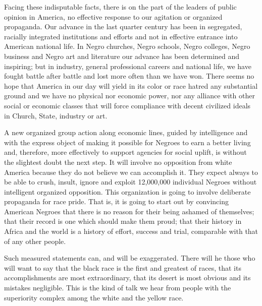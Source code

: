 \documentclass[letterpaper,10pt,english]{jupyterBook}
\begin{document}
\sphinxAtStartPar
Facing these indisputable facts, there is on the part of the leaders of public opinion in America, no effective response to our agitation or organized propaganda. Our advance in the last quarter century has been in segregated, racially integrated institutions and efforts and not in effective entrance into American national life. In Negro churches, Negro schools, Negro colleges, Negro business and Negro art and literature our advance has been determined and inspiring; but in industry, general professional careers and national life, we have fought battle after battle and lost more often than we have won. There seems no hope that America in our day will yield in its color or race hatred any substantial ground and we have no physical nor economic power, nor any alliance with other social or economic classes that will force compliance with decent civilized ideals in Church, State, industry or art.

\sphinxAtStartPar
{}

\sphinxAtStartPar
A new organized group action along economic lines, guided by intelligence and with the express object of making it possible for Negroes to earn a better living and, therefore, more effectively to support agencies for social uplift, is without the slightest doubt the next step. It will involve no opposition from white America because they do not believe we can accomplish it. They expect always to be able to crush, insult, ignore and exploit 12,000,000 individual Negroes without intelligent organized opposition. This organization is going to involve deliberate propaganda for race pride. That is, it is going to start out by convincing American Negroes that there is no reason for their being ashamed of themselves; that their record is one which should make them proud; that their history in Africa and the world is a history of effort, success and trial, comparable with that of any other people.

\sphinxAtStartPar
Such measured statements can, and will be exaggerated. There will he those who will want to say that the black race is the first and greatest of races, that its accomplishments are most extraordinary, that its desert is most obvious and its mistakes negligible. This is the kind of talk we hear from people with the superiority complex among the white and the yellow race.
\end{document}
